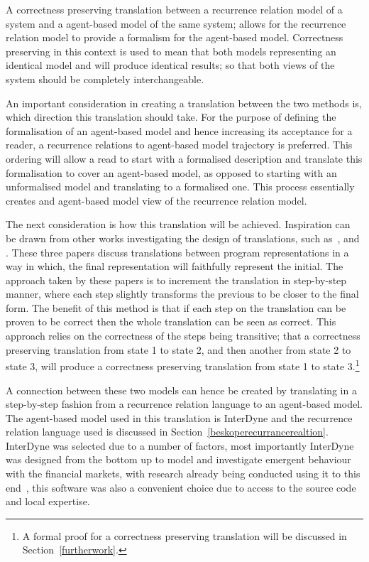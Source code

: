 \documentclass{article}
\begin{document}
A correctness preserving translation between a recurrence relation model of a system and a agent-based model of the same system; allows for the recurrence relation model to provide a formalism for the agent-based model. Correctness preserving in this context is used to mean that both models representing an identical model and will produce identical results; so that both views of the system should be completely interchangeable. 

An important consideration in creating a translation between the two methods is, which direction this translation should take. For the purpose of defining the formalisation of an agent-based model and hence increasing its acceptance for a reader, a recurrence relations to agent-based model trajectory is preferred. This ordering will allow a read to start with a formalised description and translate this formalisation to cover an agent-based model, as opposed to starting with an unformalised model and translating to a formalised one. This process essentially creates and agent-based model view of the recurrence relation model.      

The next consideration is how this translation will be achieved. Inspiration can be drawn from other works investigating the design of translations, such as~\cite{clovertrans},  \cite{transproggotmod} and  \cite{stepcorentconv}. These three papers discuss translations between program representations in a way in which, the final representation will faithfully represent the initial. The approach taken by these papers is to increment the translation in step-by-step manner, where each step slightly transforms the previous to be closer to the final form. The benefit of this method is that if each step on the translation can be proven to be correct then the whole translation can be seen as correct. This approach relies on the correctness of the steps being transitive; that a correctness preserving translation from state 1 to state 2, and then another from state 2 to state 3, will produce a correctness preserving translation from state 1 to state 3.\footnote{A formal proof for a correctness preserving translation will be discussed in Section~\ref{furtherwork}.} 

A connection between these two models can hence be created by translating in a step-by-step fashion from a recurrence relation language to an agent-based model. The agent-based model used in this translation is InterDyne and the recurrence relation language used is discussed in Section~\ref{beskoperecurrancerealtion}. InterDyne was selected due to a number of factors, most importantly InterDyne was designed from the bottom up to model and investigate emergent behaviour with the financial markets, with research already being conducted using it to this end~\cite{DynamicCoupling_Chris}, this software was also a convenient choice due to access to the source code and local expertise.
\end{document}
